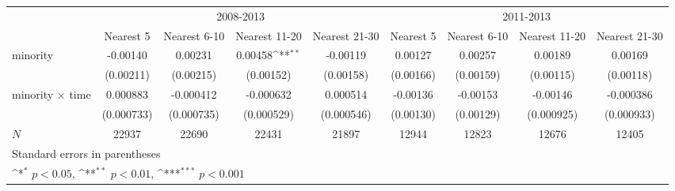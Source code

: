{
\def\sym#1{\ifmmode^{#1}\else\(^{#1}\)\fi}
\begin{tabular}{l*{8}{c}}
\hline\hline
            &\multicolumn{4}{c}{2008-2013}                                                          &\multicolumn{4}{c}{2011-2013}                                                          \\\cmidrule(lr){2-5}\cmidrule(lr){6-9}
            &\multicolumn{1}{c}{Nearest 5}&\multicolumn{1}{c}{Nearest 6-10}&\multicolumn{1}{c}{Nearest 11-20}&\multicolumn{1}{c}{Nearest 21-30}&\multicolumn{1}{c}{Nearest 5}&\multicolumn{1}{c}{Nearest 6-10}&\multicolumn{1}{c}{Nearest 11-20}&\multicolumn{1}{c}{Nearest 21-30}\\
\hline
minority    &    -0.00140         &     0.00231         &     0.00458\sym{**} &    -0.00119         &     0.00127         &     0.00257         &     0.00189         &     0.00169         \\
            &   (0.00211)         &   (0.00215)         &   (0.00152)         &   (0.00158)         &   (0.00166)         &   (0.00159)         &   (0.00115)         &   (0.00118)         \\
[1em]
minority $\times$ time&    0.000883         &   -0.000412         &   -0.000632         &    0.000514         &    -0.00136         &    -0.00153         &    -0.00146         &   -0.000386         \\
            &  (0.000733)         &  (0.000735)         &  (0.000529)         &  (0.000546)         &   (0.00130)         &   (0.00129)         &  (0.000925)         &  (0.000933)         \\
\hline
\(N\)       &       22937         &       22690         &       22431         &       21897         &       12944         &       12823         &       12676         &       12405         \\
\hline\hline
\multicolumn{9}{l}{\footnotesize Standard errors in parentheses}\\
\multicolumn{9}{l}{\footnotesize \sym{*} \(p<0.05\), \sym{**} \(p<0.01\), \sym{***} \(p<0.001\)}\\
\end{tabular}
}
